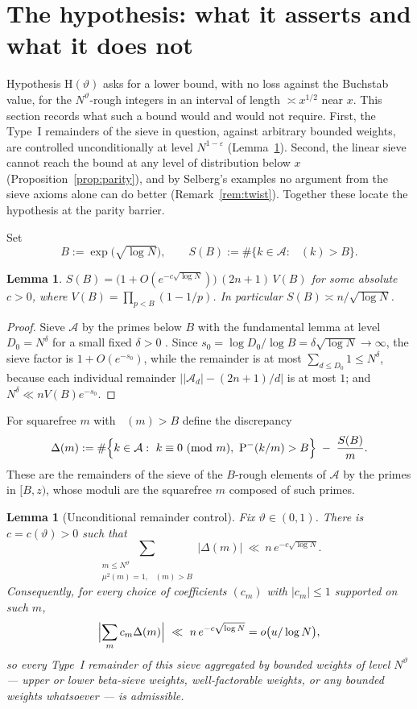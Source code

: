 \documentclass[11pt]{article}
\newtheorem{lemma}[theorem]{Lemma}
\theoremstyle{remark}
\DeclareMathOperator{\pmin}{P^{-}}
\newcommand{\N}{N}
\newcommand{\A}{\mathcal{A}}
\begin{document}
\section{The hypothesis: what it asserts and what it does not}\label{sec:hyp}

Hypothesis $\mathrm{H}(\vartheta)$ asks for a lower bound, with no loss against the
Buchstab value, for the $\N^{\vartheta}$-rough integers in an interval of length
$\asymp x^{1/2}$ near $x$. This section records what such a bound would and would not
require. First, the Type~I remainders of the sieve in question, against arbitrary
bounded weights, are controlled unconditionally at level $\N^{1-\varepsilon}$
(Lemma~\ref{lem:remainder}). Second, the linear sieve cannot reach the bound at any
level of distribution below $x$ (Proposition~\ref{prop:parity}), and by Selberg's
examples no argument from the sieve axioms alone can do better
(Remark~\ref{rem:twist}). Together these locate the hypothesis at the parity barrier.

Set
\[
B:=\exp\!\bigl(\sqrt{\log \N}\bigr),\qquad
S(B):=\#\{k\in\A:\ \pmin(k)>B\}.
\]

\begin{lemma}\label{lem:fund}
$S(B)=\bigl(1+O(e^{-c\sqrt{\log\N}})\bigr)\,(2n+1)\,V(B)$ for some absolute $c>0$, where
$V(B)=\prod_{p<B}(1-1/p)$. In particular $S(B)\asymp n/\sqrt{\log \N}$.
\end{lemma}

\begin{proof}
Sieve $\A$ by the primes below $B$ with the fundamental lemma at level
$D_0=\N^{\delta}$ for a small fixed $\delta>0$
\cite[Thm.~6.9]{FriedlanderIwaniec}. Since
$s_0=\log D_0/\log B=\delta\sqrt{\log \N}\to\infty$, the sieve factor is
$1+O(e^{-s_0})$, while the remainder is at most
$\sum_{d\le D_0}1\le \N^{\delta}$, because each individual remainder
$\bigl||\A_d|-(2n{+}1)/d\bigr|$ is at most $1$; and $\N^{\delta}\ll nV(B)e^{-s_0}$.
\end{proof}

For squarefree $m$ with $\pmin(m)>B$ define the discrepancy
\begin{equation}\label{eq:delta-def}
\Delta(m):=\#\Bigl\{k\in\A:\ k\equiv 0 \ (\mathrm{mod}\ m),\ \pmin(k/m)>B\Bigr\}
\;-\;\frac{S(B)}{m}.
\end{equation}
These are the remainders of the sieve of the $B$-rough elements of $\A$ by the primes
in $[B,z)$, whose moduli are the squarefree $m$ composed of such primes.

\begin{lemma}[Unconditional remainder control]\label{lem:remainder}
Fix $\vartheta\in(0,1)$. There is $c=c(\vartheta)>0$ such that
\[
\sum_{\substack{m\le \N^{\vartheta}\\ \mu^2(m)=1,\ \pmin(m)>B}} |\Delta(m)|
\ \ll\ n\,e^{-c\sqrt{\log \N}}.
\]
Consequently, for every choice of coefficients $(c_m)$ with $|c_m|\le 1$ supported on
such $m$,
\[
\Bigl|\sum_m c_m\Delta(m)\Bigr|\ \ll\ n\,e^{-c\sqrt{\log\N}}=o\bigl(u/\log\N\bigr),
\]
so every Type~I remainder of this sieve aggregated by bounded weights of level
$\N^{\vartheta}$ --- upper or lower beta-sieve weights, well-factorable weights, or any
bounded weights whatsoever --- is admissible.
\end{lemma}
\end{document}
